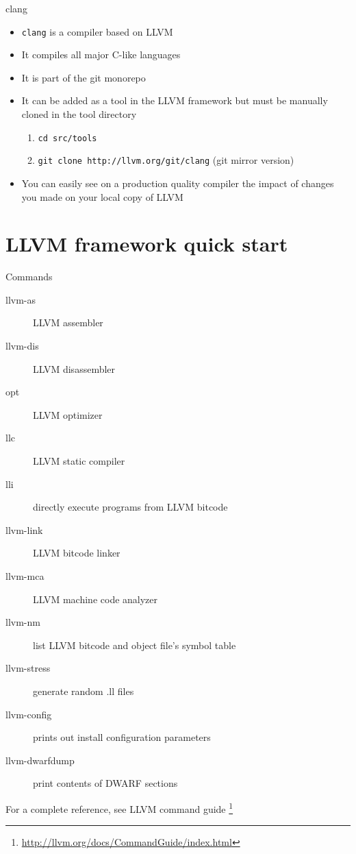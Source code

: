 \documentclass[10pt,mathserif]{beamer}
\begin{document}
\begin{frame}{clang}
\begin{itemize}
	\item \texttt{clang} is a compiler based on LLVM
	\item It compiles all major C-like languages
	\vfill
	\item It is part of the git monorepo
	\item It can be added as a tool in the LLVM framework but must be manually cloned in the tool directory
	\begin{enumerate}
		\item \texttt{cd src/tools}
		\item \texttt{git clone http://llvm.org/git/clang} (git mirror version)
	\end{enumerate}
	\vfill
	\item You can easily see on a production quality compiler the impact of changes you made on your local copy of LLVM
\end{itemize}
\end{frame}

\section{LLVM framework quick start}
\begin{frame}{Commands}
	\begin{description}
		\item[llvm-as] LLVM assembler
		\item[llvm-dis] LLVM disassembler
		\item[opt] LLVM optimizer
		\item[llc] LLVM static compiler
		\item[lli] directly execute programs from LLVM bitcode
		\item[llvm-link] LLVM bitcode linker
		\item[llvm-mca] LLVM machine code analyzer
		\item[llvm-nm] list LLVM bitcode and object file's symbol table
		\item[llvm-stress] generate random .ll files
		\item[llvm-config] prints out install configuration parameters
		\item[llvm-dwarfdump] print contents of DWARF sections
	\end{description}
	\vfill
	For a complete reference, see LLVM command guide \footnote{\url{http://llvm.org/docs/CommandGuide/index.html}}
\end{frame}
\end{document}
